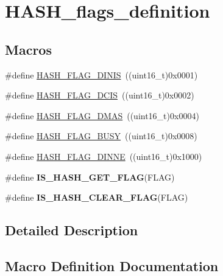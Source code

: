 \hypertarget{group___h_a_s_h__flags__definition}{}\section{H\+A\+S\+H\+\_\+flags\+\_\+definition}
\label{group___h_a_s_h__flags__definition}
\subsection*{Macros}
\begin{DoxyCompactItemize}
\item 
\#define \hyperlink{group___h_a_s_h__flags__definition_ga0f63115b39daba0d413c79f324923dd7}{H\+A\+S\+H\+\_\+\+F\+L\+A\+G\+\_\+\+D\+I\+N\+I\+S}~((uint16\+\_\+t)0x0001)
\item 
\#define \hyperlink{group___h_a_s_h__flags__definition_ga030c3298c0c54a79e5360e216bc257df}{H\+A\+S\+H\+\_\+\+F\+L\+A\+G\+\_\+\+D\+C\+I\+S}~((uint16\+\_\+t)0x0002)
\item 
\#define \hyperlink{group___h_a_s_h__flags__definition_ga576ba8b2dca0ec25fb6c53a07b285af7}{H\+A\+S\+H\+\_\+\+F\+L\+A\+G\+\_\+\+D\+M\+A\+S}~((uint16\+\_\+t)0x0004)
\item 
\#define \hyperlink{group___h_a_s_h__flags__definition_ga7638e6048806f6ba361f162db23c2a53}{H\+A\+S\+H\+\_\+\+F\+L\+A\+G\+\_\+\+B\+U\+S\+Y}~((uint16\+\_\+t)0x0008)
\item 
\#define \hyperlink{group___h_a_s_h__flags__definition_gadca9225b146f649a24d34cc813fe0c92}{H\+A\+S\+H\+\_\+\+F\+L\+A\+G\+\_\+\+D\+I\+N\+N\+E}~((uint16\+\_\+t)0x1000)
\item 
\#define {\bfseries I\+S\+\_\+\+H\+A\+S\+H\+\_\+\+G\+E\+T\+\_\+\+F\+L\+A\+G}(F\+L\+A\+G)
\item 
\#define {\bfseries I\+S\+\_\+\+H\+A\+S\+H\+\_\+\+C\+L\+E\+A\+R\+\_\+\+F\+L\+A\+G}(F\+L\+A\+G)
\end{DoxyCompactItemize}


\subsection{Detailed Description}


\subsection{Macro Definition Documentation}
\hypertarget{group___h_a_s_h__flags__definition_ga7638e6048806f6ba361f162db23c2a53}{}
